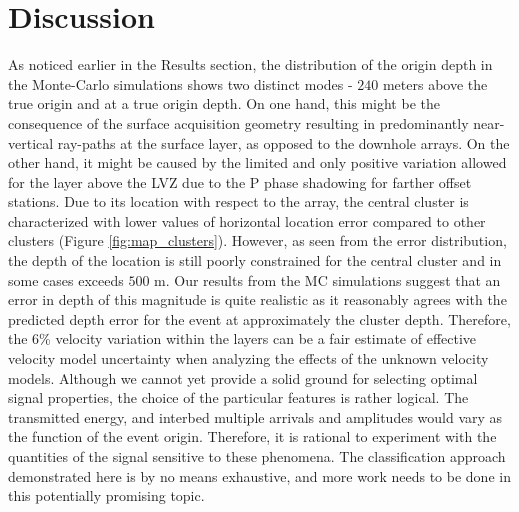 \documentclass[letterpaper,11pt]{article}
\begin{document}
\section*{Discussion}
As noticed earlier in the Results section, the distribution of the origin depth in the Monte-Carlo simulations shows two distinct modes - $240$ meters above the true origin and at a true origin depth. On one hand, this might be the consequence of the surface acquisition geometry resulting in predominantly near-vertical ray-paths at the surface layer, as opposed to the downhole arrays. On the other hand, it might be caused by the limited and only positive variation allowed for the layer above the \textsc{LVZ} due to the P phase shadowing for farther offset stations. Due to its location with respect to the array, the central cluster is characterized with lower values of horizontal location error compared to other clusters (Figure \ref{fig:map_clusters}). However, as seen from the error distribution, the depth of the location is still poorly constrained for the central cluster and in some cases exceeds $500$ m. Our results from the MC simulations suggest that an error in depth of this magnitude is quite realistic as it reasonably agrees with the predicted depth error for the event at approximately the cluster depth. Therefore, the $6$\% velocity variation within the layers can be a fair estimate of effective velocity model uncertainty when analyzing the effects of the unknown velocity models.
Although we cannot yet provide a solid ground for selecting optimal signal properties, the choice of the particular features is rather logical. The transmitted energy, and interbed multiple arrivals and amplitudes would vary as the function of the event origin. Therefore, it is rational to experiment with the quantities of the signal sensitive to these phenomena. The classification approach demonstrated here is by no means exhaustive, and more work needs to be done in this potentially promising topic.



\end{document}
